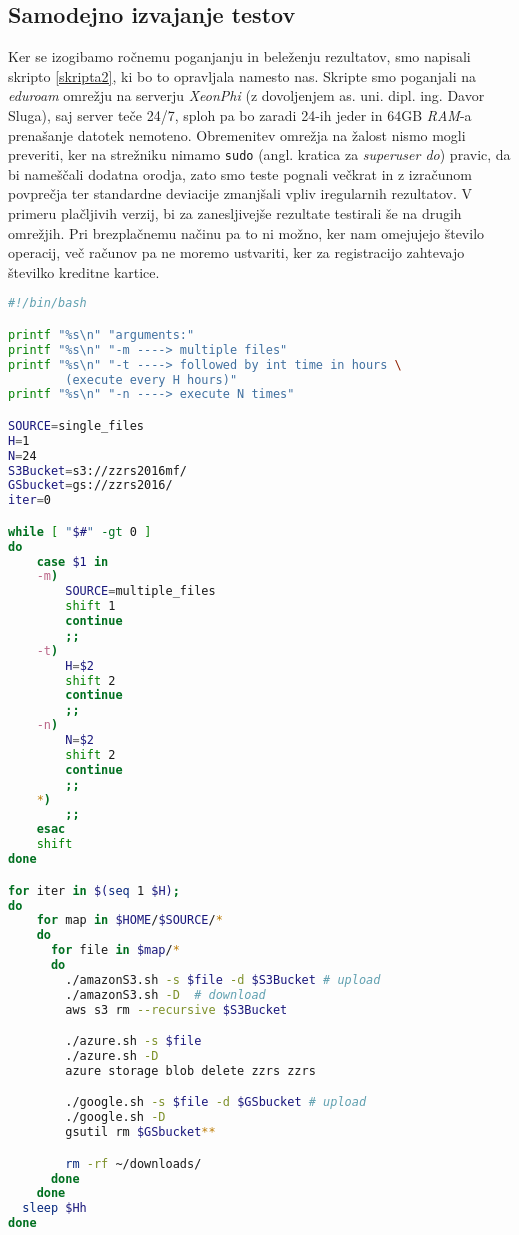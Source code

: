 \documentclass[11pt]{article}
\begin{document}
\subsection{Samodejno izvajanje testov}
Ker se izogibamo ročnemu poganjanju in beleženju rezultatov, smo napisali skripto \ref{skripta2}, ki bo to opravljala namesto nas. Skripte smo poganjali na \textit{eduroam} omrežju na serverju \textit{XeonPhi} (z dovoljenjem as. uni. dipl. ing. Davor Sluga), saj server teče 24/7, sploh pa bo zaradi 24-ih jeder in 64GB \textit{RAM}-a prenašanje datotek nemoteno. Obremenitev omrežja na žalost nismo mogli preveriti, ker na strežniku nimamo \texttt{sudo} (angl. kratica za \textit{superuser do}) pravic, da bi nameščali dodatna orodja, zato smo teste pognali večkrat in z izračunom povprečja ter standardne deviacije zmanjšali vpliv iregularnih rezultatov.
V primeru plačljivih verzij, bi za zanesljivejše rezultate testirali še na drugih omrežjih. Pri brezplačnemu načinu pa to ni možno, ker nam omejujejo število operacij, več računov pa ne moremo ustvariti, ker za registracijo zahtevajo številko kreditne kartice.\\

\begin{lstlisting}[language=bash, captionpos=b, caption={Skripta za samodejno izvajanje testov.}, label={skripta2}]
#!/bin/bash

printf "%s\n" "arguments:"
printf "%s\n" "-m ----> multiple files"
printf "%s\n" "-t ----> followed by int time in hours \
        (execute every H hours)"
printf "%s\n" "-n ----> execute N times"

SOURCE=single_files
H=1
N=24
S3Bucket=s3://zzrs2016mf/
GSbucket=gs://zzrs2016/
iter=0

while [ "$#" -gt 0 ]
do
	case $1 in
	-m)
		SOURCE=multiple_files
		shift 1
		continue
		;;
    -t)
        H=$2
        shift 2
        continue
        ;;
    -n)
        N=$2
        shift 2
        continue
        ;;
	*)
		;;
	esac
	shift
done

for iter in $(seq 1 $H);
do
    for map in $HOME/$SOURCE/*
    do
      for file in $map/*
      do
        ./amazonS3.sh -s $file -d $S3Bucket # upload
        ./amazonS3.sh -D  # download
        aws s3 rm --recursive $S3Bucket

        ./azure.sh -s $file 
        ./azure.sh -D 
        azure storage blob delete zzrs zzrs

        ./google.sh -s $file -d $GSbucket # upload
        ./google.sh -D
        gsutil rm $GSbucket**

        rm -rf ~/downloads/
      done
    done
  sleep $Hh
done

\end{lstlisting}
\end{document}
